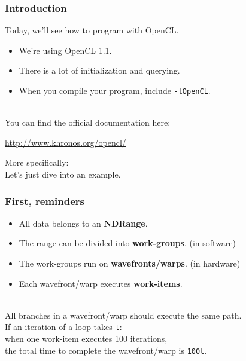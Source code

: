\begin{frame}
  \frametitle{Introduction}



  Today, we'll see how to program with OpenCL.

  \begin{itemize}
    \item We're using OpenCL 1.1.
    \item There is a lot of initialization and querying.
    \item When you compile your program, include {\tt -lOpenCL}.
  \end{itemize}~\\[1em]

  You can find the official documentation here:

  \qquad \url{http://www.khronos.org/opencl/}

  More specifically:\\
  \vfill
  Let's just dive into an example.

\end{frame}

\begin{frame}
  \frametitle{First, reminders}


  \begin{itemize}
    \item All data belongs to an {\bf NDRange}.
    \item The range can be divided into {\bf work-groups}. (in software)
    \item The work-groups run on {\bf wavefronts/warps}. (in hardware)
    \item Each wavefront/warp executes {\bf work-items}.
  \end{itemize}~\\[1em]

  \alert{All branches in a wavefront/warp should execute the same path.}~\\[1em]

  \alert{If an iteration of a loop takes {\tt t}:\\ when one work-item executes 100
    iterations,\\ the total time to complete the wavefront/warp is {\tt 100t}.}

\end{frame}

